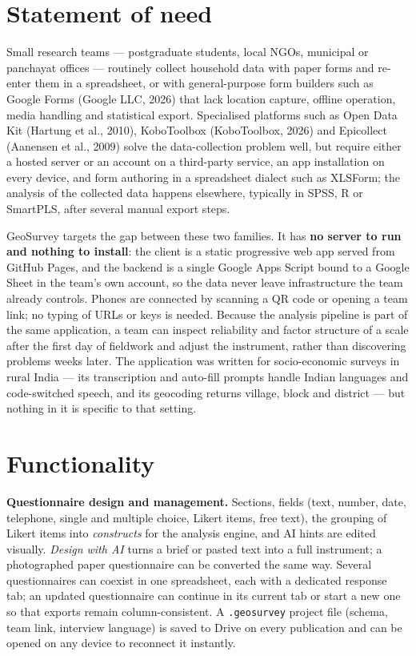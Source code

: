 \documentclass[10pt,a4paper,onecolumn]{article}
\begin{document}
\section{Statement of need}\label{statement-of-need}

Small research teams --- postgraduate students, local NGOs, municipal or
panchayat offices --- routinely collect household data with paper forms
and re-enter them in a spreadsheet, or with general-purpose form
builders such as Google Forms (Google LLC, 2026) that lack location
capture, offline operation, media handling and statistical export.
Specialised platforms such as Open Data Kit (Hartung et al., 2010),
KoboToolbox (KoboToolbox, 2026) and Epicollect ({Aanensen et al.}, 2009)
solve the data-collection problem well, but require either a hosted
server or an account on a third-party service, an app installation on
every device, and form authoring in a spreadsheet dialect such as
XLSForm; the analysis of the collected data happens elsewhere, typically
in SPSS, R or SmartPLS, after several manual export steps.

GeoSurvey targets the gap between these two families. It has \textbf{no
server to run and nothing to install}: the client is a static
progressive web app served from GitHub Pages, and the backend is a
single Google Apps Script bound to a Google Sheet in the team's own
account, so the data never leave infrastructure the team already
controls. Phones are connected by scanning a QR code or opening a team
link; no typing of URLs or keys is needed. Because the analysis pipeline
is part of the same application, a team can inspect reliability and
factor structure of a scale after the first day of fieldwork and adjust
the instrument, rather than discovering problems weeks later. The
application was written for socio-economic surveys in rural India ---
its transcription and auto-fill prompts handle Indian languages and
code-switched speech, and its geocoding returns village, block and
district --- but nothing in it is specific to that setting.

\section{Functionality}\label{functionality}

\textbf{Questionnaire design and management.} Sections, fields (text,
number, date, telephone, single and multiple choice, Likert items, free
text), the grouping of Likert items into \emph{constructs} for the
analysis engine, and AI hints are edited visually. \emph{Design with AI}
turns a brief or pasted text into a full instrument; a photographed
paper questionnaire can be converted the same way. Several
questionnaires can coexist in one spreadsheet, each with a dedicated
response tab; an updated questionnaire can continue in its current tab
or start a new one so that exports remain column-consistent. A
\texttt{.geosurvey} project file (schema, team link, interview language)
is saved to Drive on every publication and can be opened on any device
to reconnect it instantly.
\end{document}
